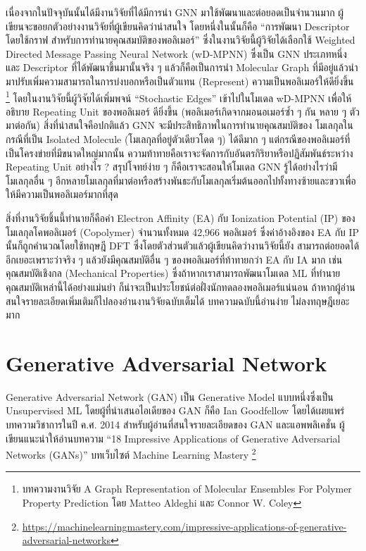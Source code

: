เนื่องจากในปัจจุบันนั้นได้มีงานวิจัยที่ได้มีการนำ GNN มาใช้พัฒนาและต่อยอดเป็นจำนวนมาก ผู้เขียนจะขอยกตัวอย่างงานวิจัยที่ผู้เขียนคิดว่าน่าสนใจ 
โดยหนึ่งในนั้นก็คือ \enquote{การพัฒนา Descriptor โดยใช้กราฟ สำหรับการทำนายคุณสมบัติของพอลิเมอร์}\autocite{aldeghi2022} 
ซึ่งในงานวิจัยนี้ผู้วิจัยได้เลือกใช้ Weighted Directed Message Passing Neural Network (wD-MPNN) ซึ่งเป็น GNN ประเภทหนึ่ง และ 
Descriptor ที่ได้พัฒนาขึ้นมานั้นจริง ๆ แล้วก็คือเป็นการนำ Molecular Graph ที่มีอยู่แล้วนำมาปรับเพิ่มความสามารถในการบ่งบอกหรือเป็นตัวแทน 
(Represent) ความเป็นพอลิเมอร์ให้ดียิ่งขึ้น%
\footnote{บทความงานวิจัย A Graph Representation of Molecular Ensembles For Polymer Property Prediction โดย 
Matteo Aldeghi และ Connor W. Coley} 
โดยในงานวิจัยนี้ผู้วิจัยได้เพิ่มพจน์ \enquote{Stochastic Edges} เข้าไปในโมเดล wD-MPNN เพื่อให้อธิบาย Repeating Unit ของพอลิเมอร์%
ดียิ่งขึ้น (พอลิเมอร์เกิดจากมอนอเมอร์ซ้ำ ๆ กัน หลาย ๆ ตัวมาต่อกัน) สิ่งที่น่าสนใจคือปกติแล้ว GNN จะมีประสิทธิภาพในการทำนายคุณสมบัติของ%
โมเลกุลในกรณีที่เป็น Isolated Molecule (โมเลกุลที่อยู่ตัวเดียวโดด ๆ) ได้ดีมาก ๆ แต่กรณีของพอลิเมอร์ที่เป็นโครงข่ายที่มีขนาดใหญ่มากนั้น 
ความท้าทายคือเราจะจัดการกับอันตรกิริยาหรือปฏิสัมพันธ์ระหว่าง Repeating Unit อย่างไร ? สรุปโจทย์ง่าย ๆ ก็คือเราจะสอนให้โมเดล GNN 
รู้ได้อย่างไรว่ามีโมเลกุลอื่น ๆ อีกหลายโมเลกุลที่มาต่อหรือสร้างพันธะกับโมเลกุลเริ่มต้นออกไปทั้งทางซ้ายและขวาเพื่อให้มีความเป็นพอลิเมอร์มากที่สุด 

สิ่งที่งานวิจัยชิ้นนี้ทำนายก็คือค่า Electron Affinity (EA) กับ Ionization Potential (IP) ของโมเลกุลโคพอลิเมอร์ (Copolymer) 
จำนวนทั้งหมด 42,966 พอลิเมอร์ ซึ่งค่าอ้างอิงของ EA กับ IP นั้นก็ถูกคำนวณโดยใช้ทฤษฎี DFT ซึ่งโดยตัวส่วนตัวแล้วผู้เขียนคิดว่างานวิจัยนี้ยัง%
สามารถต่อยอดได้อีกเยอะเพราะว่าจริง ๆ แล้วยังมีคุณสมบัติอื่น ๆ ของพอลิเมอร์ที่ท้าทายกว่า EA กับ IA มาก เช่น คุณสมบัติเชิงกล (Mechanical 
Properties) ซึ่งถ้าหากเราสามารถพัฒนาโมเดล ML ที่ทำนายคุณสมบัติเหล่านี้ได้อย่างแม่นยำ ก็น่าจะเป็นประโยชน์ต่อฝั่งนักทดลองพอลิเมอร์แน่นอน
ถ้าหากผู้อ่านสนใจรายละเอียดเพิ่มเติมก็ไปลองอ่านงานวิจัยฉบับเต็มได้ บทความฉบับนี้อ่านง่าย ไม่ลงทฤษฎีเยอะมาก

\section{Generative Adversarial Network}
\label{sec:gan}

Generative Adversarial Network (GAN) เป็น Generative Model แบบหนึ่งซึ่งเป็น Unsupervised ML โดยผู้ที่นำเสนอไอเดียของ GAN 
ก็คือ Ian Goodfellow โดยได้เผยแพร่บทความวิชาการในปี ค.ศ. 2014\autocite{goodfellow2014b} สำหรับผู้อ่านที่สนใจรายละเอียดของ 
GAN และแอพพลิเคชั่น ผู้เขียนแนะนำให้อ่านบทความ \enquote{18 Impressive Applications of Generative Adversarial Networks 
(GANs)} บทเว็บไซต์ Machine Learning Mastery%
\footnote{\url{https://machinelearningmastery.com/impressive-applications-of-generative-adversarial-networks}}

